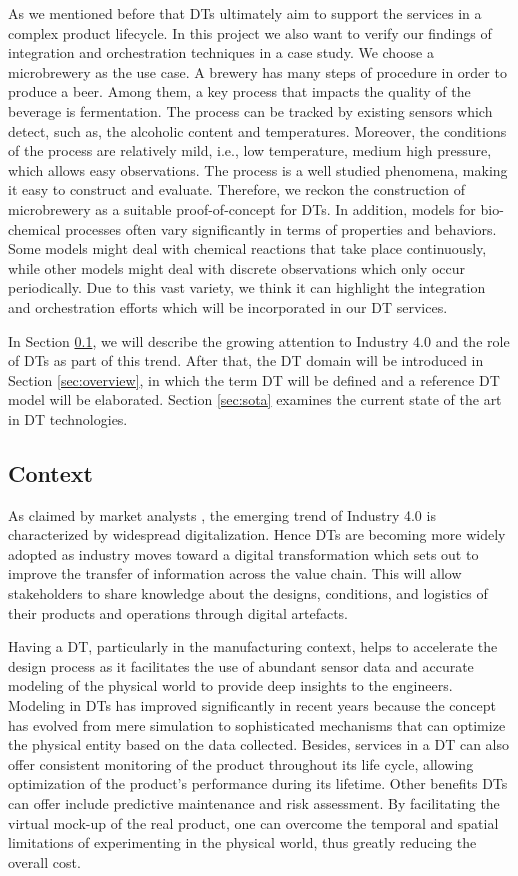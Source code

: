 \documentclass[journal,onecolumn]{IEEEtran} %
\begin{document}
As we mentioned before that DTs ultimately aim to support the services in a complex product lifecycle. In this project we also want to verify our findings of integration and orchestration techniques in a case study. We choose a microbrewery as the use case. A brewery has many steps of procedure in order to produce a beer. Among them, a key process that impacts the quality of the beverage is fermentation. The process can be tracked by existing sensors which detect, such as, the alcoholic content and temperatures. Moreover, the conditions of the process are relatively mild, i.e., low temperature, medium high pressure, which allows easy observations. The process is a well studied phenomena, making it easy to construct and evaluate. Therefore, we reckon the construction of microbrewery as a suitable proof-of-concept for DTs. In addition, models for bio-chemical processes often vary significantly in terms of properties and behaviors. Some models might deal with chemical reactions that take place continuously, while other models might deal with discrete observations which only occur periodically. Due to this vast variety, we think it can highlight the integration and orchestration efforts which will be incorporated in our DT services.

In Section \ref{sec:context}, we will describe the growing attention to Industry 4.0 and the role of DTs as part of this trend. After that, the DT domain will be introduced in Section \ref{sec:overview}, in which the term DT will be defined and a reference DT model will be elaborated. Section \ref{sec:sota} examines the current state of the art in DT technologies.

\subsection{Context}\label{sec:context}
As claimed by market analysts \cite{pwc2014} \cite{ibm}, the emerging trend of Industry 4.0 is characterized by widespread digitalization. Hence DTs are becoming more widely adopted as industry moves toward a digital transformation which sets out to improve the transfer of information across the value chain. This will allow stakeholders to share knowledge about the designs, conditions, and logistics of their products and operations through digital artefacts. 

Having a DT, particularly in the manufacturing context, helps to accelerate the design process as it facilitates the use of abundant sensor data and accurate modeling of the physical world to provide deep insights to the engineers. Modeling in DTs has improved significantly in recent years because the concept has evolved from mere simulation to sophisticated mechanisms that can optimize the physical entity based on the data collected. Besides, services in a DT can also offer consistent monitoring of the product throughout its life cycle, allowing optimization of the product’s performance during its lifetime. Other benefits DTs can offer include predictive maintenance and risk assessment. By facilitating the virtual mock-up of the real product, one can overcome the temporal and spatial limitations of experimenting in the physical world, thus greatly reducing the overall cost.
\end{document}
